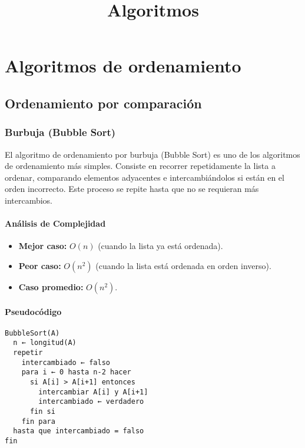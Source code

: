 \documentclass[11pt,openany]{book}
\title{Algoritmos}
\begin{document}
\chapter{Algoritmos de ordenamiento}

\section{Ordenamiento por comparación}
\subsection{Burbuja (Bubble Sort)}
El algoritmo de ordenamiento por burbuja (Bubble Sort) es uno de los algoritmos de ordenamiento más simples. Consiste en recorrer repetidamente la lista a ordenar, comparando elementos adyacentes e intercambiándolos si están en el orden incorrecto. Este proceso se repite hasta que no se requieran más intercambios.
\subsubsection{Análisis de Complejidad}
\begin{itemize}
    \item \textbf{Mejor caso:} $O(n)$ (cuando la lista ya está ordenada).
    \item \textbf{Peor caso:} $O(n^2)$ (cuando la lista está ordenada en orden inverso).
    \item \textbf{Caso promedio:} $O(n^2)$.
\end{itemize}
\subsubsection{Pseudocódigo}
\begin{verbatim}
BubbleSort(A)
  n ← longitud(A)
  repetir
    intercambiado ← falso
    para i ← 0 hasta n-2 hacer
      si A[i] > A[i+1] entonces
        intercambiar A[i] y A[i+1]
        intercambiado ← verdadero
      fin si
    fin para
  hasta que intercambiado = falso
fin
\end{verbatim}
\end{document}
